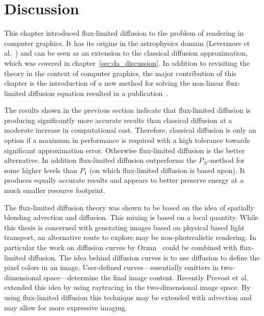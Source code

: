 \section{Discussion}
\label{sec:fld_discussion}

This chapter introduced flux-limited diffusion to the problem of rendering in computer graphics. It has its origins in the astrophysics domain (Levermore et al.~\cite{Levermore81}) and can be seen as an extension to the classical diffusion approximation, which was covered in chapter~\ref{sec:da_discussion}. In addition to revisiting the theory in the context of computer graphics, the major contribution of this chapter is the introduction of a new method for solving the non-linear flux-limited diffusion equation resulted in a publication~\cite{Koerner14}.

The results shown in the previous section indicate that flux-limited diffusion is producing significantly more accurate results than classical diffusion at a moderate increase in computational cost. Therefore, classical diffusion is only an option if a maximum in performance is required with a high tolerance towards significant approximation error. Otherwise flux-limited diffusion is the better alternative. In addition flux-limited diffusion outperforms the $P_N$-method for some higher levels than $P_1$ (on which flux-limited diffusion is based upon). It produces equally accurate results and appears to better preserve energy at a much smaller resource footprint.

The flux-limited diffusion theory was shown to be based on the idea of spatially blending advection and diffusion. This mixing is based on a local quantity. While this thesis is concerned with generating images based on physical based light transport, an alternative route to explore may be non-photrealistic rendering. In particular the work on diffusion curves by Orzan~\cite{Orzan08} could be combined with flux-limited diffusion. The idea behind diffusion curves is to use diffusion to define the pixel colors in an image. User-defined curves---essentially emitters in two-dimensional space---determine the final image content. Recently Prevost et al.~\cite{Prevost15} extended this idea by using raytracing in the two-dimensional image space. By using flux-limited diffusion this technique may be extended with advection and may allow for more expressive imaging.


